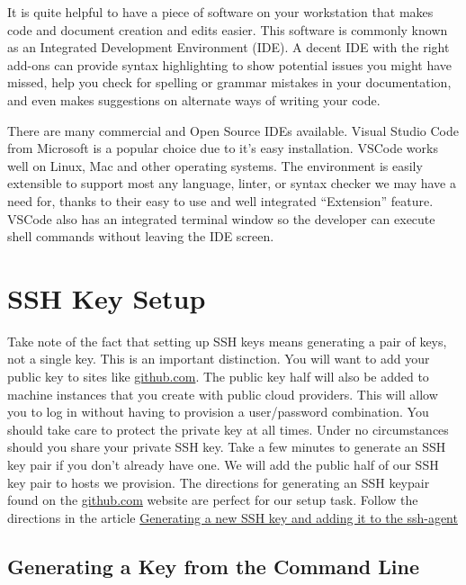 \justify{}
It is quite helpful to have a piece of software on your workstation that makes code and document creation and edits easier. This
software is commonly known as an Integrated Development Environment (IDE). A decent IDE with the right add-ons can
provide syntax highlighting to show potential issues you might have missed, help you check for spelling or
grammar mistakes in your documentation, and even makes suggestions on alternate ways of writing your code.

\justify{}
There are many commercial and Open Source IDEs available. Visual Studio Code from Microsoft is a popular choice due to it's easy
installation. VSCode works well on Linux, Mac and other operating systems.
The environment is easily extensible to support most any language, linter, or syntax checker we may have a need
for, thanks to their easy to use and well integrated ``Extension'' feature. VSCode also has an integrated terminal
window so the developer can execute shell commands without leaving the IDE screen.

\section{SSH Key Setup}

\justify{}
Take note of the fact that setting up SSH keys means generating a pair of keys, not a single key. This is an important 
distinction. You will want to add your public key to sites like \href{github.com}{github.com}. The public key half will
also be added to machine instances that you create with public cloud providers. This will allow you to log in without
having to provision a user/password combination. You should take care to 
protect the private key at all times. Under no circumstances should you share your private SSH key.\cite{ssh}
\justify{}
Take a few minutes to generate an SSH key pair if you don't already have one. We will add the public half of
our SSH key pair to hosts we provision. The directions for generating an SSH keypair found on the
\href{github.com}{github.com} website are perfect for our setup task. Follow the directions in the article 
\href{https://docs.github.com/en/github/authenticating-to-github/connecting-to-github-with-ssh/generating-a-new-ssh-key-and-adding-it-to-the-ssh-agent}{Generating a new SSH key and adding it to the ssh-agent}

\subsection{Generating a Key from the Command Line}

